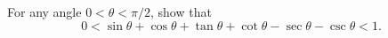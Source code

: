 For any angle $0 < \theta < \pi/2$, show that
\[0 < \sin \theta + \cos \theta + \tan \theta + \cot \theta - \sec \theta - \csc \theta < 1.\]